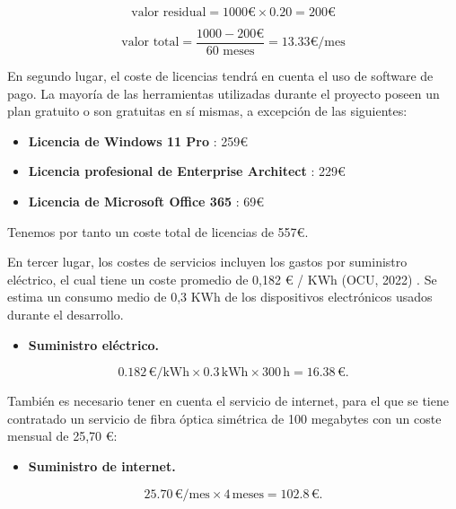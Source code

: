 \begin{equation}
    \text{valor residual} = 1000 \text{€} \times 0.20 = 200 \text{€}
\end{equation}

\begin{equation}
    \text{valor total} = \frac{1000 - 200 \text{€}}{60 \text{ meses}} = 13.33 \text{€/mes}
\end{equation}

En segundo lugar, el coste de licencias tendrá en cuenta el uso de software de pago. La mayoría de las herramientas utilizadas durante el proyecto poseen un plan gratuito o son gratuitas en sí mismas, a excepción de las siguientes:

\begin{itemize}
    \item \textbf{Licencia de Windows 11 Pro} \cite{licenciaWindows}: 259€
    \item \textbf{Licencia profesional de Enterprise Architect} \cite{licenciaEA}: 229€
    \item \textbf{Licencia de Microsoft Office 365} \cite{licenciaOffice}: 69€
\end{itemize}

Tenemos por tanto un coste total de licencias de 557€.

En tercer lugar, los costes de servicios incluyen los gastos por suministro eléctrico, el cual tiene un coste promedio de 0,182 € / KWh (OCU, 2022) . Se estima un consumo medio de 0,3 KWh de los dispositivos electrónicos usados durante el desarrollo.

\begin{itemize}
    \item \textbf{Suministro eléctrico.}
\end{itemize}

\begin{equation}
0.182 \, \text{€/kWh} \times 0.3 \, \text{kWh} \times 300 \, \text{h} = 16.38 \, \text{€}.
\end{equation}

También es necesario tener en cuenta el servicio de internet, para el que se tiene contratado un servicio de fibra óptica simétrica de 100 megabytes con un coste mensual de 25,70 €:

\begin{itemize}
    \item \textbf{Suministro de internet.}
\end{itemize}

\begin{equation}
25.70 \, \text{€/mes} \times 4 \, \text{meses} = 102.8 \, \text{€}.
\end{equation}

